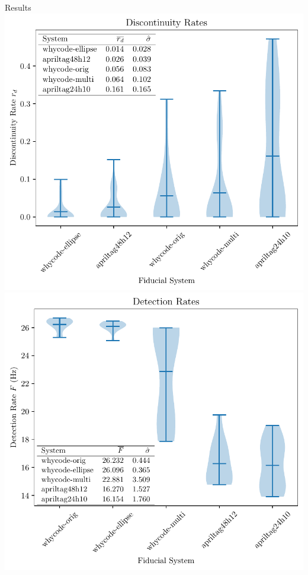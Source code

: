 \documentclass[aspectratio=169]{beamer}
\begin{document}
\begin{frame}{Results}
    \centering
    \includegraphics[width=0.49\linewidth]{./images/violin_plot_five_member}
    \includegraphics[width=0.49\linewidth]{./images/violin_plot_speed_five_member}
\end{frame}
\end{document}
